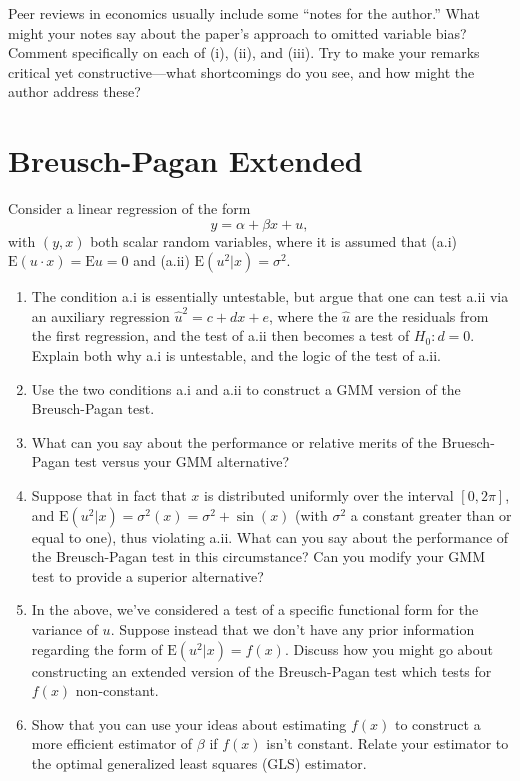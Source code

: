 \documentclass[12pt]{amsart}
\newcommand{\E}{\ensuremath{\mbox{E}}}
\begin{document}
Peer reviews in economics usually include some ``notes for the
author.''  What might your notes say about the paper's approach to
omitted variable bias?  Comment specifically on each of (i), (ii),
and (iii).  Try to make your remarks critical yet
constructive---what shortcomings do you see, and how might the
author address these?

\section{Breusch-Pagan Extended}
\label{sec:org052bc99}
Consider a linear regression of the form
\[ 
     y = \alpha + \beta x + u,
  \]
with \((y,x)\) both scalar random variables, where it is assumed that
(a.i) \(\E(u\cdot x) = \E u = 0\) and (a.ii) \(\E(u^2|x)=\sigma^2\).  
\begin{enumerate}
\item The condition a.i is essentially untestable, but
\cite{breusch-pagan79} argue that one can test a.ii via an
auxiliary regression \(\hat{u}^2 = c + d x + e\), where the \(\hat{u}\)
are the residuals from the first regression, and the test of a.ii
then becomes a test of \(H_0:d=0\).  Explain both why a.i is untestable, and the logic of
the test of a.ii.
\item Use the two conditions a.i and a.ii to construct a GMM version of
the Breusch-Pagan test.
\item What can you say  about the performance or relative merits of the
Bruesch-Pagan test versus your GMM alternative?
\item Suppose that in fact that \(x\) is distributed uniformly over the
interval \([0,2\pi]\), and \(\E(u^2|x)=\sigma^2(x)=\sigma^2+\sin(x)\)
(with \(\sigma^2\) a constant greater than or equal to one), thus
violating a.ii.  What can you say about the performance of the
Breusch-Pagan test in this circumstance?  Can you modify your GMM
test to provide a superior alternative?
\item In the above, we've considered a test of a specific functional
form for the variance of \(u\).  Suppose instead that we don't have
any prior information regarding the form of \(\E(u^2|x)=f(x)\).
Discuss how you might go about constructing an extended version
of the Breusch-Pagan test which tests for \(f(x)\) non-constant.
\item Show that you can use your ideas about estimating \(f(x)\) to
construct a more efficient estimator of \(\beta\) if \(f(x)\) isn't
constant.  Relate your estimator to the optimal generalized least
squares (GLS) estimator.
\end{enumerate}
\end{document}

